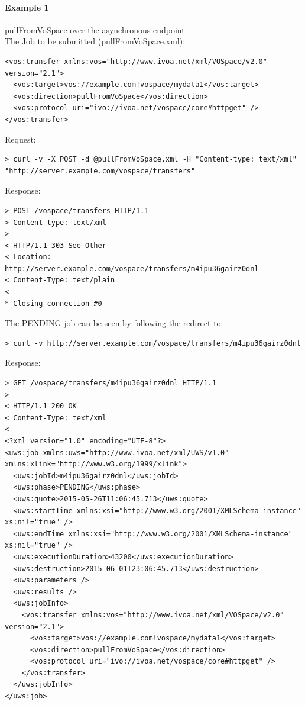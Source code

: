 \documentclass[11pt,a4paper]{ivoa}
\begin{document}
\paragraph{Example 1}
pullFromVoSpace over the asynchronous endpoint
\\[5px]
\noindent
The Job to be submitted (pullFromVoSpace.xml):
\begin{lstlisting}
<vos:transfer xmlns:vos="http://www.ivoa.net/xml/VOSpace/v2.0" version="2.1">
  <vos:target>vos://example.com!vospace/mydata1</vos:target>
  <vos:direction>pullFromVoSpace</vos:direction>
  <vos:protocol uri="ivo://ivoa.net/vospace/core#httpget" />
</vos:transfer>
\end{lstlisting}
Request:
\begin{lstlisting}
> curl -v -X POST -d @pullFromVoSpace.xml -H "Content-type: text/xml" "http://server.example.com/vospace/transfers"
\end{lstlisting}
Response:
\begin{lstlisting}
> POST /vospace/transfers HTTP/1.1
> Content-type: text/xml
>
< HTTP/1.1 303 See Other
< Location: http://server.example.com/vospace/transfers/m4ipu36gairz0dnl
< Content-Type: text/plain
<
* Closing connection #0
\end{lstlisting}
The PENDING job can be seen by following the redirect to:
\begin{lstlisting}
> curl -v http://server.example.com/vospace/transfers/m4ipu36gairz0dnl
\end{lstlisting}
Response:
\begin{lstlisting}
> GET /vospace/transfers/m4ipu36gairz0dnl HTTP/1.1
>
< HTTP/1.1 200 OK
< Content-Type: text/xml
<
<?xml version="1.0" encoding="UTF-8"?>
<uws:job xmlns:uws="http://www.ivoa.net/xml/UWS/v1.0" xmlns:xlink="http://www.w3.org/1999/xlink">
  <uws:jobId>m4ipu36gairz0dnl</uws:jobId>
  <uws:phase>PENDING</uws:phase>
  <uws:quote>2015-05-26T11:06:45.713</uws:quote>
  <uws:startTime xmlns:xsi="http://www.w3.org/2001/XMLSchema-instance" xs:nil="true" />
  <uws:endTime xmlns:xsi="http://www.w3.org/2001/XMLSchema-instance" xs:nil="true" />
  <uws:executionDuration>43200</uws:executionDuration>
  <uws:destruction>2015-06-01T23:06:45.713</uws:destruction>
  <uws:parameters />
  <uws:results />
  <uws:jobInfo>
    <vos:transfer xmlns:vos="http://www.ivoa.net/xml/VOSpace/v2.0" version="2.1">
      <vos:target>vos://example.com!vospace/mydata1</vos:target>
      <vos:direction>pullFromVoSpace</vos:direction>
      <vos:protocol uri="ivo://ivoa.net/vospace/core#httpget" />
    </vos:transfer>
  </uws:jobInfo>
</uws:job>
\end{lstlisting}
\end{document}
